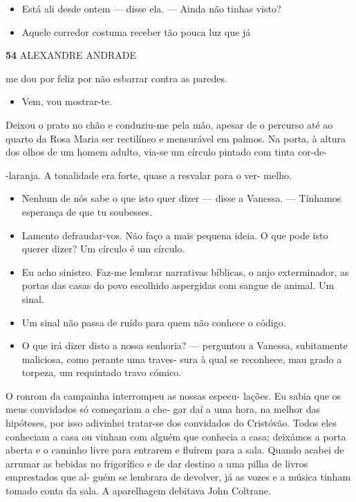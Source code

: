 \begin{itemize}
\tightlist
\item
  Está ali desde ontem --- disse ela. --- Ainda não tinhas visto?
\item
  Aquele corredor costuma receber tão pouca luz que já
\end{itemize}

\textbf{54 }ALEXANDRE ANDRADE

me dou por feliz por não esbarrar contra as paredes.

\begin{itemize}
\tightlist
\item
  Vem, vou mostrar-te.
\end{itemize}

Deixou o prato no chão e conduziu-me pela mão, apesar de o percurso até
ao quarto da Rosa Maria ser rectilíneo e mensurável em palmos. Na porta,
à altura dos olhos de um homem adulto, via-se um círculo pintado com
tinta cor-de-

-laranja. A tonalidade era forte, quase a resvalar para o ver- melho.

\begin{itemize}
\tightlist
\item
  Nenhum de nós sabe o que isto quer dizer --- disse a Vanessa. ---
  Tínhamos esperança de que tu soubesses.
\item
  Lamento defraudar-vos. Não faço a mais pequena ideia. O que pode isto
  querer dizer? Um círculo é um círculo.
\item
  Eu acho sinistro. Faz-me lembrar narrativas bíblicas, o anjo
  exterminador, as portas das casas do povo escolhido aspergidas com
  sangue de animal. Um sinal.
\item
  Um sinal não passa de ruído para quem não conhece o código.
\item
  O que irá dizer disto a nossa senhoria? --- perguntou a Vanessa,
  subitamente maliciosa, como perante uma traves- sura à qual se
  reconhece, mau grado a torpeza, um requintado travo cómico.
\end{itemize}

O ronrom da campainha interrompeu as nossas especu- lações. Eu sabia que
os meus convidados só começariam a che- gar daí a uma hora, na melhor
das hipóteses, por isso adivinhei tratar-se dos convidados do Cristóvão.
Todos eles conheciam a casa ou vinham com alguém que conhecia a casa;
deixámos a porta aberta e o caminho livre para entrarem e fluírem para a
sala. Quando acabei de arrumar as bebidas no frigorífico e de dar
destino a uma pilha de livros emprestados que al- guém se lembrara de
devolver, já as vozes e a música tinham tomado conta da sala. A
aparelhagem debitava John Coltrane.

